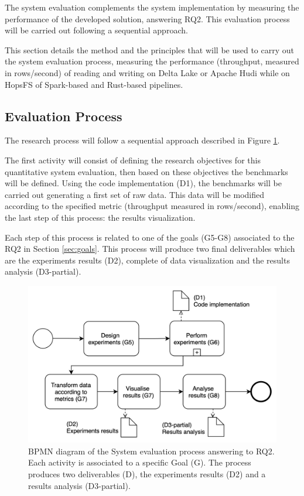 The system evaluation complements the system implementation by measuring the performance of the developed solution, answering RQ2. This evaluation process will be carried out following a sequential approach.

This section details the method and the principles that will be used to carry out the system evaluation process, measuring the performance (throughput, measured in rows/second) of reading and writing on Delta Lake or Apache Hudi while on \gls{HopsFS} of Spark-based and Rust-based pipelines. 

\subsection{Evaluation Process}
The research process will follow a sequential approach described in Figure \ref{fig:DevProcessRQ2}.

The first activity will consist of defining the research objectives for this quantitative system evaluation, then based on these objectives the benchmarks will be defined. Using the code implementation (D1), the benchmarks will be carried out generating a first set of raw data. This data will be modified according to the specified metric (throughput measured in rows/second), enabling the last step of this process: the results visualization. 

Each step of this process is related to one of the goals (G5-G8) associated to the RQ2 in Section \ref{sec:goals}. This process will produce two final deliverables which are the experiments results (D2), complete of data visualization and the results analysis (D3-partial).

\begin{figure}[!ht]
    \begin{center}
      \includegraphics[width=\textwidth]{figures/3-method/research_process_rq2.png}
    \caption{\gls{BPMN} diagram of the System evaluation process answering to RQ2. Each activity is associated to a specific Goal (\gls{G}). The process produces two deliverables (\gls{D}), the experiments results (D2) and a results analysis (D3-partial).}
    \label{fig:DevProcessRQ2}
    \end{center}
\end{figure}

